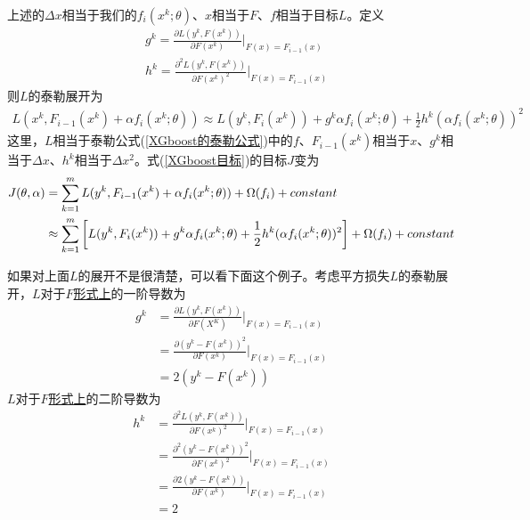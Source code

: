           上述的$\Delta x$相当于我们的$f_i(x^k;\theta)$、$x$相当于$F$、$f$相当于目标$L$。定义
          \begin{align*}
          & g^k = \frac{\partial L(y^k,F(x^k))}{\partial F(x^k)}\bigg|_{F(x) = F_{i-1}(x)}\\
          & h^k = \frac{\partial^2 L(y^k,F(x^k))}{\partial F(x^k)^2}\bigg|_{F(x) = F_{i-1}(x)}
          \end{align*}
          则$L$的泰勒展开为
          \begin{align*}
           L(x^k,F_{i-1}(x^k)+\alpha f_i(x^k;\theta))
          \approx  L(y^k,F_{i}(x^k)) + g^k\alpha f_i(x^k;\theta)+\frac{1}{2}h^k (\alpha f_i(x^k;\theta))^2
          \end{align*}
          这里，$L$相当于泰勒公式(\ref{XGboost的泰勒公式})中的$f$、$F_{i-1}(x^k)$相当于$x$、$g^k$相当于$\Delta x$、$h^k$相当于$\Delta x^2$。式(\ref{XGboost目标})的目标$J$变为
          \begin{align}
          \label{XGboost目标2}
          J(\theta,\alpha) &= \sum_{k=1}^m L(y^k,F_{i-1}(x^k)+\alpha f_i(x^k;\theta))+\Omega(f_i)+constant\notag \\
          &\approx \sum_{k=1}^m \left[ L(y^k,F_{i}(x^k)) + g^k\alpha f_i(x^k;\theta)+\frac{1}{2}h^k (\alpha f_i(x^k;\theta))^2 \right]+ \Omega(f_i)+constant
          \end{align}
          \par
          如果对上面$L$的展开不是很清楚，可以看下面这个例子。考虑平方损失$L$的泰勒展开，$L$对于$F$\underline{形式上}的一阶导数为
          \begin{align*}
          g^k &= \frac{\partial L(y^k, F(x^k))}{\partial F(X^K)}\bigg|_{F(x) = F_{i-1}(x)}\\
          & = \frac{\partial (y^k - F(x^k))^2}{\partial F(x^k)}\bigg|_{F(x) = F_{i-1}(x)}\\
          & = 2(y^k - F(x^k))
          \end{align*}
          $L$对于$F$\underline{形式上}的二阶导数为
          \begin{align*}
          h^k & = \frac{\partial^2 L(y^k,F(x^k))}{\partial F(x^k)^2}\bigg|_{F(x) = F_{i-1}(x)}\\
          & = \frac{\partial ^2 (y^k - F(x^k))^2}{\partial F(x^k)^2}\bigg|_{F(x) = F_{i-1}(x)}\\
          & = \frac{\partial 2(y^k - F(x^k))}{\partial F(x^k)}\bigg|_{F(x) = F_{i-1}(x)}\\
          &=2
          \end{align*}
